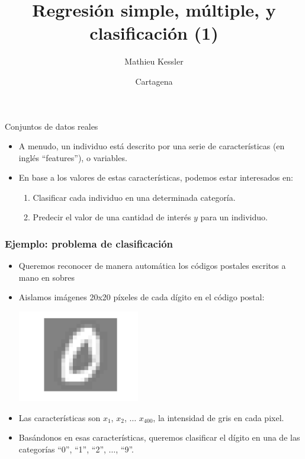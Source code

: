\documentclass[aspectratio=169]{beamer}
\title{Regresión simple, múltiple, y clasificación (1)}
\author[Kessler]{Mathieu Kessler}
\institute[UPCT]{
  Departamento de Matemática Aplicada y Estadística\\
  Universidad Politécnica de Cartagena}
\date[Cartagena]{Cartagena}
\begin{document}
\begin{frame}
  \titlepage
\end{frame}
 \begin{frame}
   \begin{block}{Conjuntos de datos reales}
     \begin{itemize}
     \item<+-> A menudo, un individuo está descrito por una serie de características (en inglés ``features''), o variables.
     \item<+-> En base a los valores de estas características, podemos estar interesados en:
       \begin{enumerate}
       \item Clasificar cada individuo en una determinada categoría.
       \item Predecir el valor de una cantidad de interés $y$ para un individuo.
       \end{enumerate}
     \end{itemize}
   \end{block}
 \end{frame}
\begin{frame}\frametitle{Ejemplo: problema de clasificación}
  {\scriptsize \begin{itemize}
  \item<+-> Queremos reconocer de manera automática los códigos postales escritos a mano en sobres
  \item<+-> Aislamos imágenes 20x20 píxeles de cada dígito en el código postal:
  \begin{center}
    \includegraphics[height=4cm]{digito-09.png}
  \end{center}
\item<+-> Las características son $x_1$, $x_2$, $\ldots$ $x_{400}$, la intensidad de gris en cada pixel.
\item<+-> Basándonos en esas características, queremos clasificar el dígito en una de las categorías ``0'', ``1'', ``2'', $\ldots$, ``9''.
  \end{itemize}
}
 \end{frame}
\end{document}

